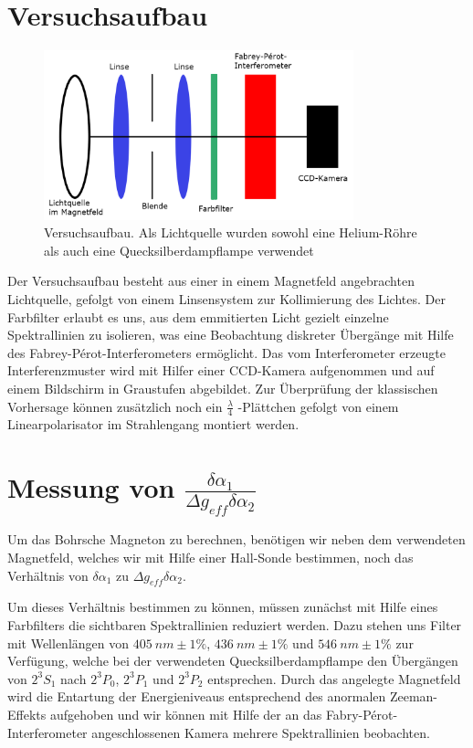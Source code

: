 \documentclass[bigchapter,colorback,accentcolor=tud4b,linedtoc,11pt]{tudreport}
\begin{document}
\section{Versuchsaufbau}
\begin{figure}[H] 
  \centering
     \includegraphics[width=0.8\textwidth]{img/aufbau.png}
     \caption{Versuchsaufbau. Als Lichtquelle wurden sowohl eine Helium-Röhre
       als auch eine Quecksilberdampflampe verwendet}
  \label{fig:aufbau}
\end{figure}

Der Versuchsaufbau besteht aus einer in einem Magnetfeld angebrachten
Lichtquelle, gefolgt von einem Linsensystem zur Kollimierung des Lichtes. Der
Farbfilter erlaubt es uns, aus dem emmitierten Licht gezielt einzelne
Spektrallinien zu isolieren, was eine Beobachtung diskreter Übergänge mit Hilfe
des Fabrey-Pérot-Interferometers ermöglicht. Das vom Interferometer erzeugte
Interferenzmuster wird mit Hilfer einer CCD-Kamera aufgenommen und auf einem
Bildschirm in Graustufen abgebildet. Zur Überprüfung der klassischen Vorhersage
können zusätzlich noch ein $\frac{\lambda}{4}$ -Plättchen gefolgt von einem
Linearpolarisator im Strahlengang montiert werden.

\section{Messung von $\frac{\delta\alpha_1}{\Delta g_{eff} \delta\alpha_2}$}

Um das Bohrsche Magneton zu berechnen, benötigen wir neben dem verwendeten
Magnetfeld, welches wir mit Hilfe einer Hall-Sonde bestimmen, noch das
Verhältnis von $\delta\alpha_1$ zu $\Delta g_{eff} \delta\alpha_2$.

Um dieses Verhältnis bestimmen zu können, müssen zunächst mit Hilfe eines
Farbfilters die sichtbaren Spektrallinien reduziert werden. Dazu stehen uns Filter
mit Wellenlängen von $405 ~nm \pm 1\%$, $436 ~nm \pm 1\%$ und $546 ~nm \pm 1\%$
zur Verfügung, welche bei der verwendeten Quecksilberdampflampe den Übergängen von
$2^3S_1$ nach $2^3P_0$, $2^3P_1$ und $2^3P_2$ entsprechen. Durch das angelegte
Magnetfeld wird die Entartung der Energieniveaus entsprechend des anormalen
Zeeman-Effekts aufgehoben und wir können mit Hilfe der an das
Fabry-Pérot-Interferometer angeschlossenen Kamera mehrere
Spektrallinien beobachten.
\end{document}
